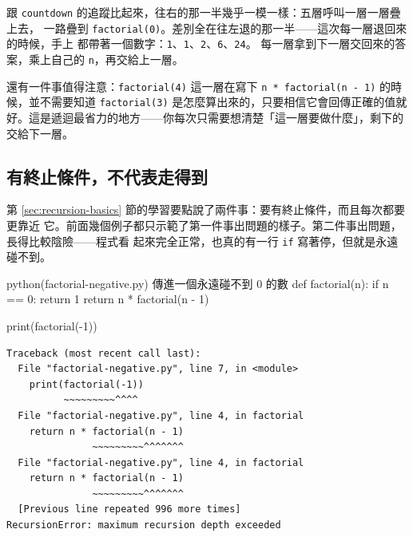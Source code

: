 
跟 \texttt{countdown} 的追蹤比起來，往右的那一半幾乎一模一樣：五層呼叫一層一層疊上去，
一路疊到 \texttt{factorial(0)}。差別全在往左退的那一半——這次每一層退回來的時候，手上
都帶著一個數字：\texttt{1}、\texttt{1}、\texttt{2}、\texttt{6}、\texttt{24}。
每一層拿到下一層交回來的答案，乘上自己的 \texttt{n}，再交給上一層。

還有一件事值得注意：\texttt{factorial(4)} 這一層在寫下 \texttt{n * factorial(n - 1)}
的時候，並不需要知道 \texttt{factorial(3)} 是怎麼算出來的，只要相信它會回傳正確的值就
好。這是遞迴最省力的地方——你每次只需要想清楚「這一層要做什麼」，剩下的交給下一層。

\subsection*{有終止條件，不代表走得到}

第 \ref{sec:recursion-basics} 節的學習要點說了兩件事：要有終止條件，而且每次都要更靠近
它。前面幾個例子都只示範了第一件事出問題的樣子。第二件事出問題，長得比較陰險——程式看
起來完全正常，也真的有一行 \texttt{if} 寫著停，但就是永遠碰不到。

\begin{example}{python}{(factorial-negative.py) 傳進一個永遠碰不到 0 的數}
def factorial(n):
    if n == 0:
        return 1
    return n * factorial(n - 1)


print(factorial(-1))
\end{example}

\begin{verbatim}
Traceback (most recent call last):
  File "factorial-negative.py", line 7, in <module>
    print(factorial(-1))
          ~~~~~~~~~^^^^
  File "factorial-negative.py", line 4, in factorial
    return n * factorial(n - 1)
               ~~~~~~~~~^^^^^^^
  File "factorial-negative.py", line 4, in factorial
    return n * factorial(n - 1)
               ~~~~~~~~~^^^^^^^
  [Previous line repeated 996 more times]
RecursionError: maximum recursion depth exceeded
\end{verbatim}

